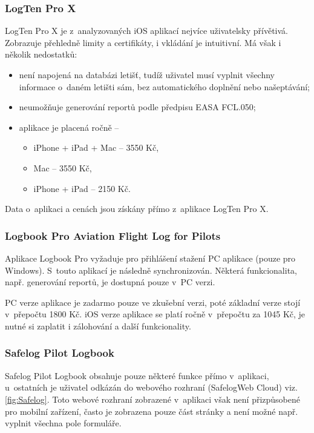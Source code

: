 \documentclass[thesis=M,czech]{FITthesis}[2012/06/26]
\begin{document}
\subsubsection{LogTen Pro X}
LogTen Pro X je z~analyzovaných iOS aplikací nejvíce uživatelsky přívětivá. Zobrazuje přehledně limity a certifikáty, i vkládání je intuitivní. Má však i několik nedostatků: 
\begin{itemize}
\item není napojená na databázi letišť, tudíž uživatel musí vyplnit všechny informace o~daném letišti sám, bez automatického doplnění nebo našeptávání;
\item neumožňuje generování reportů podle předpisu EASA FCL.050;
\item aplikace je placená ročně --
	\begin{itemize}
	\item iPhone + iPad + Mac -- 3550 Kč,
	\item Mac -- 3550 Kč,
	\item iPhone + iPad -- 2150 Kč.
	\end{itemize}
\end{itemize}
Data o~aplikaci a cenách jsou získány přímo z~aplikace LogTen Pro X. 

\subsubsection{Logbook Pro Aviation Flight Log for Pilots}
Aplikace Logbook Pro vyžaduje pro přihlášení stažení PC aplikace (pouze pro Windows). S~touto aplikací je následně synchronizován. Některá funkcionalita, např. generování reportů, je dostupná pouze v~PC verzi.

PC verze aplikace je zadarmo pouze ve zkušební verzi, poté základní verze stojí v~přepočtu 1800 Kč. iOS verze aplikace se platí ročně v~přepočtu za 1045 Kč, je nutné si zaplatit i zálohování a další funkcionality. \cite{SafelogPrices}

\subsubsection{Safelog Pilot Logbook}
Safelog Pilot Logbook obsahuje pouze některé funkce přímo v~aplikaci, u~ostatních je uživatel odkázán do webového rozhraní (SafelogWeb Cloud) viz. \ref{fig:Safelog}. Toto webové rozhraní zobrazené v~aplikaci však není přizpůsobené pro mobilní zařízení, často je zobrazena pouze část stránky a není možné např. vyplnit všechna pole formuláře.
\end{document}
